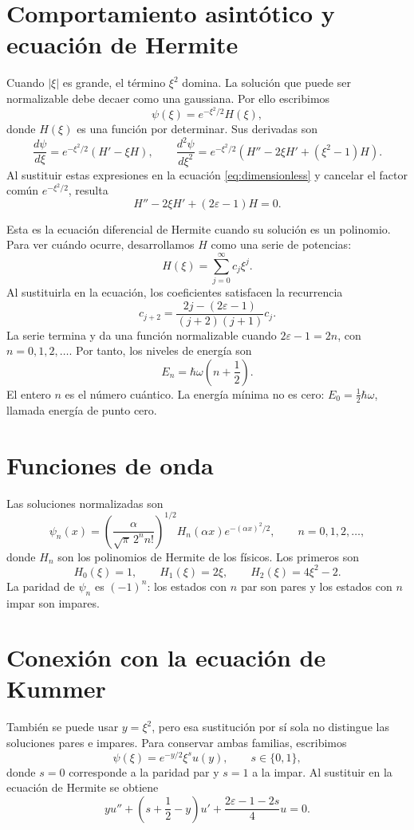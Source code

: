 \documentclass[12pt]{article}
\begin{document}
\section{Comportamiento asintótico y ecuación de Hermite}

Cuando \(|\xi|\) es grande, el término \(\xi^2\) domina. La solución que puede
ser normalizable debe decaer como una gaussiana. Por ello escribimos
\[
\psi(\xi)=e^{-\xi^2/2}H(\xi),
\]
donde \(H(\xi)\) es una función por determinar. Sus derivadas son
\[
\frac{d\psi}{d\xi}
=e^{-\xi^2/2}\left(H'-\xi H\right),
\qquad
\frac{d^2\psi}{d\xi^2}
=e^{-\xi^2/2}\left(H''-2\xi H'+(\xi^2-1)H\right).
\]
Al sustituir estas expresiones en la ecuación
\eqref{eq:dimensionless} y cancelar el factor común \(e^{-\xi^2/2}\), resulta
\[
H''-2\xi H'+(2\varepsilon-1)H=0.
\]

Esta es la ecuación diferencial de Hermite cuando su solución es un polinomio.
Para ver cuándo ocurre, desarrollamos \(H\) como una serie de potencias:
\[
H(\xi)=\sum_{j=0}^{\infty}c_j\xi^j.
\]
Al sustituirla en la ecuación, los coeficientes satisfacen la recurrencia
\[
c_{j+2}
=\frac{2j-(2\varepsilon-1)}{(j+2)(j+1)}c_j.
\]
La serie termina y da una función normalizable cuando
\(2\varepsilon-1=2n\), con \(n=0,1,2,\ldots\). Por tanto, los niveles de
energía son
\[
E_n=\hbar\omega\left(n+\frac{1}{2}\right).
\]
El entero \(n\) es el número cuántico. La energía mínima no es cero:
\(E_0=\frac{1}{2}\hbar\omega\), llamada energía de punto cero.

\section{Funciones de onda}

Las soluciones normalizadas son
\[
\psi_n(x)
=
\left(\frac{\alpha}{\sqrt{\pi}\,2^n n!}\right)^{1/2}
H_n(\alpha x)e^{-(\alpha x)^2/2},
\qquad n=0,1,2,\ldots,
\]
donde \(H_n\) son los polinomios de Hermite de los físicos. Los primeros son
\[
H_0(\xi)=1,\qquad
H_1(\xi)=2\xi,\qquad
H_2(\xi)=4\xi^2-2.
\]
La paridad de \(\psi_n\) es \((-1)^n\): los estados con \(n\) par son pares y
los estados con \(n\) impar son impares.

\section{Conexión con la ecuación de Kummer}

También se puede usar \(y=\xi^2\), pero esa sustitución por sí sola no
distingue las soluciones pares e impares. Para conservar ambas familias,
escribimos
\[
\psi(\xi)=e^{-y/2}\xi^s u(y),
\qquad s\in\{0,1\},
\]
donde \(s=0\) corresponde a la paridad par y \(s=1\) a la impar. Al sustituir
en la ecuación de Hermite se obtiene
\[
yu''+\left(s+\frac{1}{2}-y\right)u'
+\frac{2\varepsilon-1-2s}{4}u=0.
\]
\end{document}
